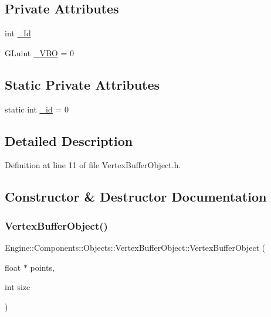 \subsection*{Private Attributes}
\begin{DoxyCompactItemize}
\item 
int \mbox{\hyperlink{classEngine_1_1Components_1_1Objects_1_1VertexBufferObject_a07adfeae7d3b23285d49b8005437ed77}{\+\_\+\+Id}}
\item 
G\+Luint \mbox{\hyperlink{classEngine_1_1Components_1_1Objects_1_1VertexBufferObject_a0014c1ab3ceb3c3437003057638b279f}{\+\_\+\+V\+BO}} = 0
\end{DoxyCompactItemize}
\subsection*{Static Private Attributes}
\begin{DoxyCompactItemize}
\item 
static int \mbox{\hyperlink{classEngine_1_1Components_1_1Objects_1_1VertexBufferObject_aee6f39eda87eb0f8c0e6644afdd72000}{\+\_\+id}} = 0
\end{DoxyCompactItemize}


\subsection{Detailed Description}


Definition at line 11 of file Vertex\+Buffer\+Object.\+h.



\subsection{Constructor \& Destructor Documentation}
\mbox{\label{classEngine_1_1Components_1_1Objects_1_1VertexBufferObject_ac6ca88e30800d79295ca9ea285101a3c}} 
\subsubsection{\texorpdfstring{Vertex\+Buffer\+Object()}{VertexBufferObject()}}
{\footnotesize\ttfamily Engine\+::\+Components\+::\+Objects\+::\+Vertex\+Buffer\+Object\+::\+Vertex\+Buffer\+Object (\begin{DoxyParamCaption}\item[{float $\ast$}]{points,  }\item[{int}]{size }\end{DoxyParamCaption})}



